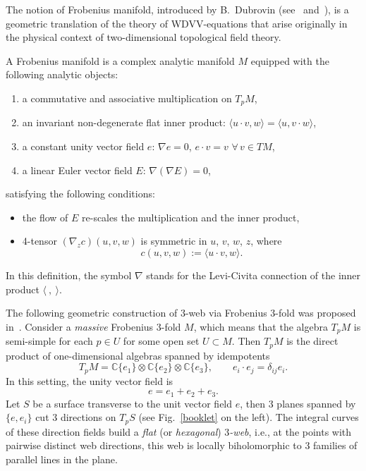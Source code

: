 \documentclass[11pt]{article}
\begin{document}
The notion of Frobenius manifold, introduced by B.~Dubrovin (see~\cite{Df} and~\cite{Mf}), is a geometric translation of the theory of WDVV-equations that arise originally in the physical context of two-dimensional topological f\/ield theory.
\begin{definition}\label{defFrob}
A Frobenius manifold is a complex analytic manifold $M$ equipped with the following
analytic objects:
\begin{enumerate}\itemsep=0pt
\item[1)] a commutative and associative multiplication on $T_pM$,
\item[2)] an invariant non-degenerate f\/lat inner product: $\langle u \cdot v, w \rangle = \langle u, v \cdot w \rangle $,
\item[3)] a constant unity vector f\/ield $e$: $\nabla e=0$, $e \cdot v=v$ $\forall\, v\in TM$,
\item[4)] a linear Euler vector f\/ield $E$: $\nabla (\nabla E)=0$,
\end{enumerate}
satisfying the following conditions:
\begin{itemize}\itemsep=0pt
\item the f\/low of $E$ re-scales the
multiplication and the inner product,
\item 4-tensor $(\nabla_z c)(u,v,w)$ is symmetric in
$u$, $v$, $w$, $z$, where
\[
c(u,v,w):=\langle u\cdot v,w\rangle.
\]
\end{itemize}
In this def\/inition, the symbol $\nabla$ stands for the Levi-Civita connection of the inner product $\langle\ ,\ \rangle$.
\end{definition}
The following geometric construction of $3$-web via Frobenius $3$-fold was proposed in~\cite{Aw}.
Consider a {\it massive} Frobenius $3$-fold $M$, which means that the algebra $T_pM$ is semi-simple for each $p\in U$ for some open set $U\subset M$. Then $T_pM$ is the direct
product of one-dimensional algebras spanned by idempotents
\begin{equation}\label{mult}
T_pM=\mathbb C \{e_1\}\otimes \mathbb C \{e_2\}\otimes \mathbb C\{e_3\}, \qquad e_i\cdot e_j=\delta_{ij}e_i.
\end{equation}
In this setting, the unity vector f\/ield is
\[
e=e_1+e_2+e_3.
\]
Let $S$ be a surface transverse to the unit vector f\/ield $e$, then 3
planes spanned by $\{e,e_i\}$ cut 3 directions on $T_pS$ (see Fig.~\ref{booklet} on the left).
The integral curves of these direction f\/ields build a {\it flat} (or {\it hexagonal}) {\it $3$-web}, i.e., at the points with pairwise distinct web directions, this web is locally biholomorphic to 3 families of parallel lines in the plane.
\end{document}
